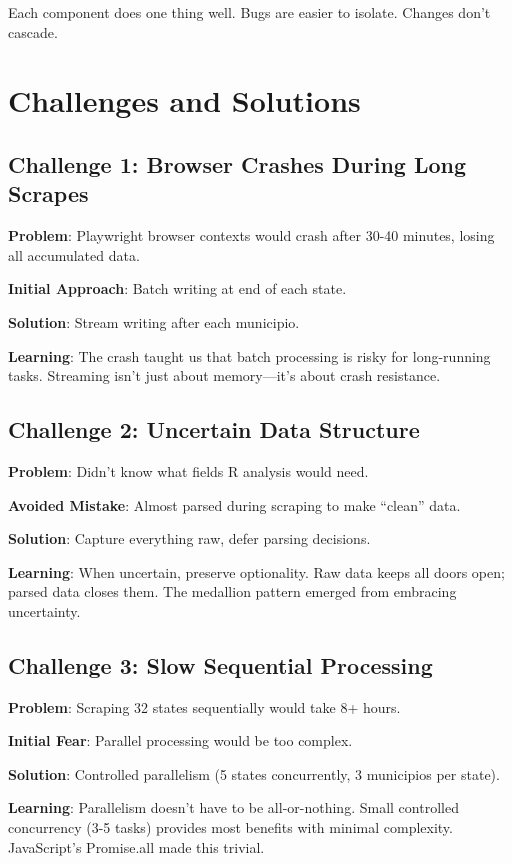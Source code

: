 \documentclass[11pt,a4paper]{article}
\begin{document}
Each component does one thing well. Bugs are easier to isolate. Changes don't cascade.

\section{Challenges and Solutions}

\subsection{Challenge 1: Browser Crashes During Long Scrapes}

\textbf{Problem}: Playwright browser contexts would crash after 30-40 minutes, losing all accumulated data.

\textbf{Initial Approach}: Batch writing at end of each state.

\textbf{Solution}: Stream writing after each municipio.

\textbf{Learning}: The crash taught us that batch processing is risky for long-running tasks. Streaming isn't just about memory—it's about crash resistance.

\subsection{Challenge 2: Uncertain Data Structure}

\textbf{Problem}: Didn't know what fields R analysis would need.

\textbf{Avoided Mistake}: Almost parsed during scraping to make ``clean'' data.

\textbf{Solution}: Capture everything raw, defer parsing decisions.

\textbf{Learning}: When uncertain, preserve optionality. Raw data keeps all doors open; parsed data closes them. The medallion pattern emerged from embracing uncertainty.

\subsection{Challenge 3: Slow Sequential Processing}

\textbf{Problem}: Scraping 32 states sequentially would take 8+ hours.

\textbf{Initial Fear}: Parallel processing would be too complex.

\textbf{Solution}: Controlled parallelism (5 states concurrently, 3 municipios per state).

\textbf{Learning}: Parallelism doesn't have to be all-or-nothing. Small controlled concurrency (3-5 tasks) provides most benefits with minimal complexity. JavaScript's Promise.all made this trivial.
\end{document}
